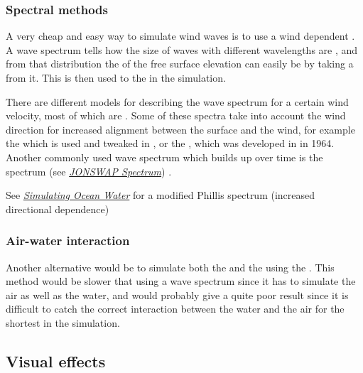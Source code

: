 \subsubsection{Spectral methods}

A very cheap and easy way to simulate wind waves is to use a wind dependent . A wave spectrum tells how the size of waves with different wavelengths are \distributed, and from that distribution the  of the free surface elevation can easily be \generated by taking a \random \sample from it. This is then used to \initialize the  in the simulation.

There are different models for describing the wave spectrum for a certain wind velocity, most of which are \empirical. Some of these spectra take into account the wind direction for increased alignment between the surface and the wind, for example the  which is used and tweaked in \citep{temp}, or the , which was developed in  \citep{temp} in 1964. Another commonly used wave spectrum which builds up over time is the \JONSWAP spectrum (see \textit{\href{http://www.wikiwaves.org/Ocean-Wave\_Spectra\#JONSWAP\_Spectrum}{JONSWAP Spectrum}}) \citep{temp}.

See \textit{\href{http://graphics.ucsd.edu/courses/rendering/2005/jdewall/tessendorf.pdf}{Simulating Ocean Water}} for a modified Phillis spectrum (increased directional dependence)

\subsubsection{Air-water interaction}

Another alternative would be to simulate both the \water and the \air using the \FVM. This method would be slower that using a wave spectrum since it has to simulate the air as well as the water, and would probably give a quite poor result since it is difficult to catch the correct interaction between the water and the air for the shortest \wavelengths in the simulation.

\subsection{Visual effects}

